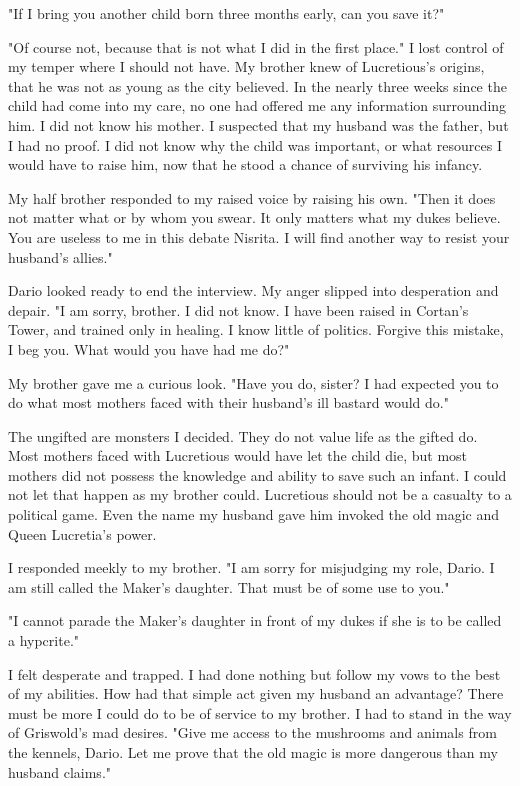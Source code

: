 \documentclass{article}
\begin{document}
"If I bring you another child born three months early, can you save it?"

"Of course not, because that is not what I did in the first place." I lost control of my temper where I should not have. My brother knew of Lucretious's origins, that he was not as young as the city believed. In the nearly three weeks since the child had come into my care, no one had offered me any information surrounding him. I did not know his mother. I suspected that my husband was the father, but I had no proof. I did not know why the child was important, or what resources I would have to raise him, now that he stood a chance of surviving his infancy.

My half brother responded to my raised voice by raising his own. "Then it does not matter what or by whom you swear. It only matters what my dukes believe. You are useless to me in this debate Nisrita. I will find another way to resist your husband's allies."

Dario looked ready to end the interview. My anger slipped into desperation and depair. "I am sorry, brother. I did not know. I have been raised in Cortan's Tower, and trained only in healing. I know little of politics. Forgive this mistake, I beg you. What would you have had me do?"

My brother gave me a curious look. "Have you do, sister? I had expected you to do what most mothers faced with their husband's ill bastard would do."

The ungifted are monsters I decided. They do not value life as the gifted do. Most mothers faced with Lucretious would have let the child die, but most mothers did not possess the knowledge and ability to save such an infant. I could not let that happen as my brother could. Lucretious should not be a casualty to a political game. Even the name my husband gave him invoked the old magic and Queen Lucretia's power.

I responded meekly to my brother. "I am sorry for misjudging my role, Dario. I am still called the Maker's daughter. That must be of some use to you."

"I cannot parade the Maker's daughter in front of my dukes if she is to be called a hypcrite."

I felt desperate and trapped. I had done nothing but follow my vows to the best of my abilities. How had that simple act given my husband an advantage? There must be more I could do to be of service to my brother. I had to stand in the way of Griswold's mad desires. "Give me access to the mushrooms and animals from the kennels, Dario. Let me prove that the old magic is more dangerous than my husband claims."
\end{document}
